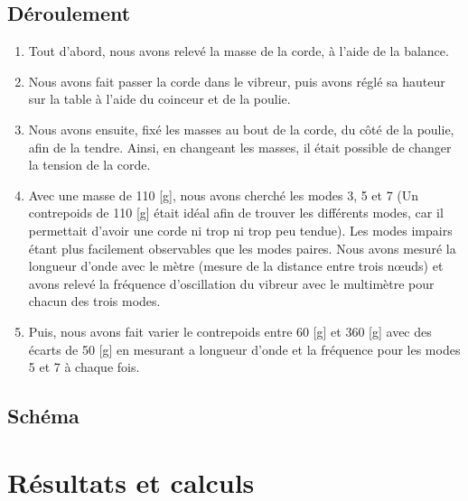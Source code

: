 \documentclass[11pt]{article}
\begin{document}
    \subsection{Déroulement}\label{subsec:deroulement}

    \begin{enumerate}
        \item Tout d'abord, nous avons relevé la masse de la corde, à l'aide de la balance.
        \item Nous avons fait passer la corde dans le vibreur, puis avons réglé sa hauteur sur la table à
            l'aide du coinceur et de la poulie.
        \item Nous avons ensuite, fixé les masses au bout de la corde, du côté de la poulie, afin de la
            tendre.
            Ainsi, en changeant les masses, il était possible de changer la tension de la corde.
        \item Avec une masse de 110 [g], nous avons cherché les modes 3, 5 et 7 (Un contrepoids de 110 [g]
            était idéal afin de trouver les différents modes, car il permettait d'avoir une corde ni trop ni
            trop peu tendue).
            Les modes impairs étant plus facilement observables que les modes paires.
            Nous avons mesuré la longueur d'onde avec le mètre (mesure de la distance entre trois nœuds) et
            avons relevé la fréquence d'oscillation du vibreur avec le multimètre pour chacun des trois modes.
        \item Puis, nous avons fait varier le contrepoids entre 60 [g] et 360 [g] avec des écarts de 50 [g]
            en mesurant a longueur d'onde et la fréquence pour les modes 5 et 7 à chaque fois.
    \end{enumerate}

    \subsection{Schéma}\label{subsec:schema}
    
    

    \section{Résultats et calculs}\label{sec:resultats-et-calculs}
\end{document}
